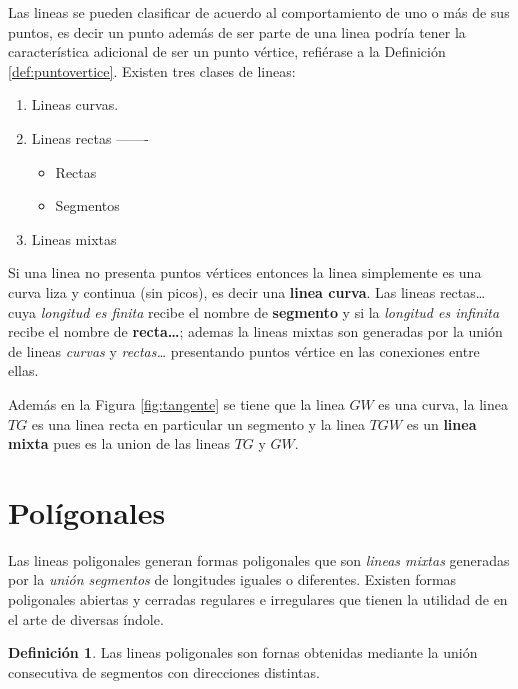 \documentclass[16pt,]{krantz}
\providecommand{\tightlist}{%
  \setlength{\itemsep}{0pt}\setlength{\parskip}{0pt}}
\theoremstyle{definition}
\newtheorem{definition}{Definición}[chapter]
\theoremstyle{definition}
\theoremstyle{definition}
\theoremstyle{definition}
\theoremstyle{remark}
\begin{document}
Las lineas se pueden clasificar de acuerdo al comportamiento de uno o más de sus puntos, es decir un punto además de ser parte de una linea podría tener la característica adicional de ser un punto vértice, refiérase a la Definición \ref{def:puntovertice}. Existen tres clases de lineas:

\begin{enumerate}
\def\labelenumi{\arabic{enumi}.}
\item
  Lineas curvas.
\item
  Lineas rectas -------

  \begin{itemize}
  \tightlist
  \item
    Rectas
  \item
    Segmentos
  \end{itemize}
\item
  Lineas mixtas
\end{enumerate}

Si una linea no presenta puntos vértices entonces la linea simplemente es una curva liza y continua (sin picos), es decir una \textbf{linea curva}. Las lineas rectas\ldots{} cuya \emph{longitud es finita} recibe el nombre de \textbf{segmento} y si la \emph{longitud es infinita} recibe el nombre de \textbf{recta\ldots{}}; ademas la lineas mixtas son generadas por la unión de lineas \emph{curvas} y \emph{rectas\ldots{}} presentando puntos vértice en las conexiones entre ellas.

Además en la Figura \ref{fig:tangente} se tiene que la linea \(GW\) es una curva, la linea \(TG\) es una linea recta en particular un segmento y la linea \(TGW\) es un \textbf{linea mixta} pues es la union de las lineas \(TG\) y \(GW\).

\hypertarget{poluxedgonales}{%
\section{Polígonales}\label{poluxedgonales}}

Las lineas poligonales generan formas poligonales que son \emph{lineas mixtas} generadas por la \emph{unión segmentos} de longitudes iguales o diferentes. Existen formas poligonales abiertas y cerradas regulares e irregulares que tienen la utilidad de en el arte de diversas índole.

\begin{definition}
\protect\hypertarget{def:poligonal}{}{\label{def:poligonal} }Las lineas poligonales son fornas obtenidas mediante la unión consecutiva de segmentos con direcciones distintas.
\end{definition}
\end{document}

